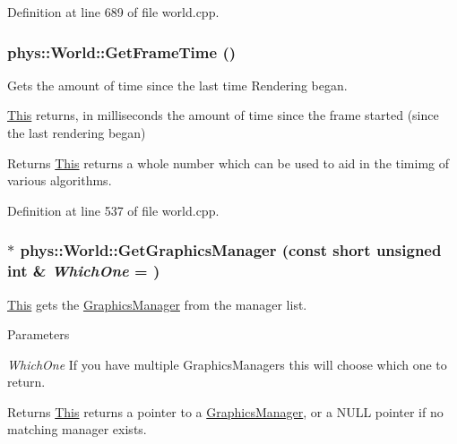 Definition at line 689 of file world.cpp.

\hypertarget{classphys_1_1World_a348cebf8f15202a9916ac1b2400c63b1}{
\subsubsection[{GetFrameTime}]{ phys::World::GetFrameTime ()}}
\label{da/ddf/classphys_1_1World_a348cebf8f15202a9916ac1b2400c63b1}


Gets the amount of time since the last time Rendering began. 

\hyperlink{structThis}{This} returns, in milliseconds the amount of time since the frame started (since the last rendering began) \begin{DoxyReturn}{Returns}
\hyperlink{structThis}{This} returns a whole number which can be used to aid in the timimg of various algorithms. 
\end{DoxyReturn}


Definition at line 537 of file world.cpp.

\hypertarget{classphys_1_1World_a15f968adb5d841da6c5eb51607a8f525}{
\subsubsection[{GetGraphicsManager}]{ $\ast$ phys::World::GetGraphicsManager (const short unsigned int \& {\em WhichOne} = {})}}
\label{da/ddf/classphys_1_1World_a15f968adb5d841da6c5eb51607a8f525}


\hyperlink{structThis}{This} gets the \hyperlink{classphys_1_1GraphicsManager}{GraphicsManager} from the manager list. 


\begin{DoxyParams}{Parameters}
\item[{\em WhichOne}]If you have multiple GraphicsManagers this will choose which one to return. \end{DoxyParams}
\begin{DoxyReturn}{Returns}
\hyperlink{structThis}{This} returns a pointer to a \hyperlink{classphys_1_1GraphicsManager}{GraphicsManager}, or a NULL pointer if no matching manager exists. 
\end{DoxyReturn}


